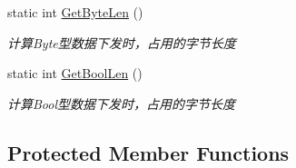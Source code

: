 \begin{DoxyCompactItemize}
static int \mbox{\hyperlink{class_t_net_1_1_service_1_1_data_struct_a7ac5ac3f8c001d71d6c6ec5630e00b97}{Get\+Byte\+Len}} ()
\begin{DoxyCompactList}\small\item\em 计算\+Byte型数据下发时，占用的字节长度 \end{DoxyCompactList}\item 
static int \mbox{\hyperlink{class_t_net_1_1_service_1_1_data_struct_aa925d65c69a29a1acdcc51e2347c3e2c}{Get\+Bool\+Len}} ()
\begin{DoxyCompactList}\small\item\em 计算\+Bool型数据下发时，占用的字节长度 \end{DoxyCompactList}\end{DoxyCompactItemize}
\subsection*{Protected Member Functions}
